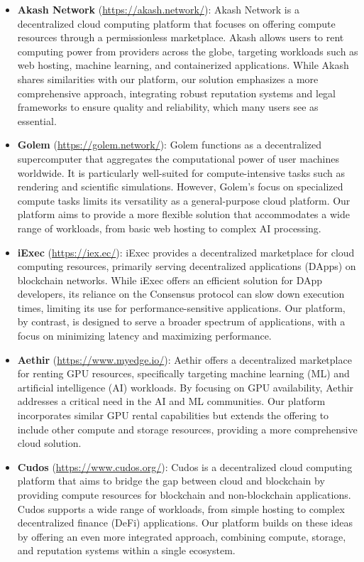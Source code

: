 \begin{itemize}
    \item {\bf Akash Network} (\url{https://akash.network/}): Akash Network is a decentralized cloud computing platform that focuses on offering compute resources through a permissionless marketplace. Akash allows users to rent computing power from providers across the globe, targeting workloads such as web hosting, machine learning, and containerized applications. While Akash shares similarities with our platform, our solution emphasizes a more comprehensive approach, integrating robust reputation systems and legal frameworks to ensure quality and reliability, which many users see as essential.

    \item {\bf Golem} (\url{https://golem.network/}): Golem functions as a decentralized supercomputer that aggregates the computational power of user machines worldwide. It is particularly well-suited for compute-intensive tasks such as rendering and scientific simulations. However, Golem's focus on specialized compute tasks limits its versatility as a general-purpose cloud platform. Our platform aims to provide a more flexible solution that accommodates a wide range of workloads, from basic web hosting to complex AI processing.

    \item {\bf iExec} (\url{https://iex.ec/}): iExec provides a decentralized marketplace for cloud computing resources, primarily serving decentralized applications (DApps) on blockchain networks. While iExec offers an efficient solution for DApp developers, its reliance on the Consensus protocol can slow down execution times, limiting its use for performance-sensitive applications. Our platform, by contrast, is designed to serve a broader spectrum of applications, with a focus on minimizing latency and maximizing performance.

    \item {\bf Aethir} (\url{https://www.myedge.io/}): Aethir offers a decentralized marketplace for renting GPU resources, specifically targeting machine learning (ML) and artificial intelligence (AI) workloads. By focusing on GPU availability, Aethir addresses a critical need in the AI and ML communities. Our platform incorporates similar GPU rental capabilities but extends the offering to include other compute and storage resources, providing a more comprehensive cloud solution.

    \item {\bf Cudos} (\url{https://www.cudos.org/}): Cudos is a decentralized cloud computing platform that aims to bridge the gap between cloud and blockchain by providing compute resources for blockchain and non-blockchain applications. Cudos supports a wide range of workloads, from simple hosting to complex decentralized finance (DeFi) applications. Our platform builds on these ideas by offering an even more integrated approach, combining compute, storage, and reputation systems within a single ecosystem.


\end{itemize}
